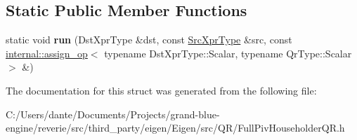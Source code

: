 \subsection*{Static Public Member Functions}
\begin{DoxyCompactItemize}
\item 
\mbox{\label{struct_eigen_1_1internal_1_1_assignment_3_01_dst_xpr_type_00_01_inverse_3_01_full_piv_householde4c13323440da58b97e1a51d313048bfd_a65c6aaebd0c9c0ae0b79b8b104a60cdc}} 
static void {\bfseries run} (Dst\+Xpr\+Type \&dst, const \mbox{\hyperlink{class_eigen_1_1_inverse}{Src\+Xpr\+Type}} \&src, const \mbox{\hyperlink{struct_eigen_1_1internal_1_1assign__op}{internal\+::assign\+\_\+op}}$<$ typename Dst\+Xpr\+Type\+::\+Scalar, typename Qr\+Type\+::\+Scalar $>$ \&)
\end{DoxyCompactItemize}


The documentation for this struct was generated from the following file\+:\begin{DoxyCompactItemize}
\item 
C\+:/\+Users/dante/\+Documents/\+Projects/grand-\/blue-\/engine/reverie/src/third\+\_\+party/eigen/\+Eigen/src/\+Q\+R/Full\+Piv\+Householder\+Q\+R.\+h\end{DoxyCompactItemize}
